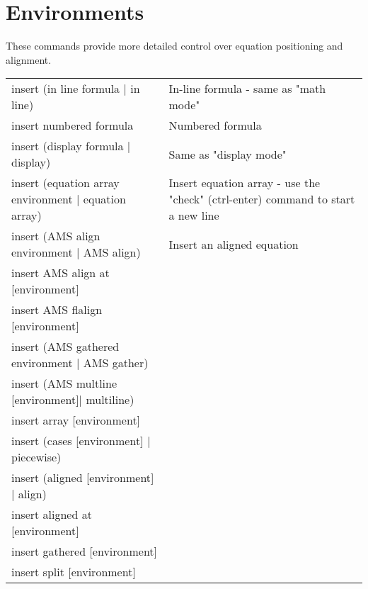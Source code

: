 \documentclass[12pt]{article}
\begin{document}
\section{Environments}
These commands provide more detailed control over equation positioning and alignment.

\begin{tabularx}{\linewidth}{ l X}
insert (in line formula | in line) & In-line formula - same as "math mode" \\
insert numbered formula & Numbered formula \\
insert (display formula | display) & Same as "display mode" \\
insert (equation array environment | equation array) & Insert equation array - use the "check" (ctrl-enter) command to start a new line \\
insert (AMS align environment | AMS align) & Insert an aligned equation \\
insert AMS align at [environment] &  \\
insert AMS flalign [environment] &  \\
insert (AMS gathered environment | AMS gather) &  \\
insert (AMS multline [environment]| multiline) &  \\
insert array [environment] &  \\
insert (cases [environment] | piecewise) &  \\
insert (aligned [environment] | align) &  \\
insert aligned at [environment] &  \\
insert gathered [environment] &  \\
insert split [environment] &  \\
\end{tabularx}
\end{document}
